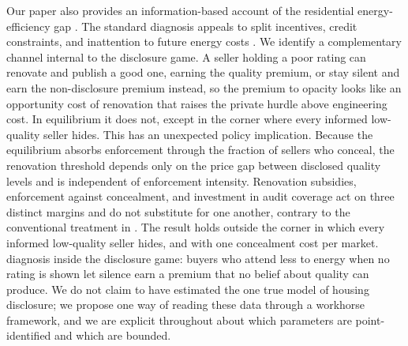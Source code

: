 Our paper also provides an information-based account of the residential energy-efficiency gap
\citep{allcott_is_2012, gerarden_assessing_2017}. The standard diagnosis appeals to split
incentives, credit constraints, and inattention to future energy costs \citep{allcott_consumers_2011, sallee_rational_2014, allcott_evaluating_2015}. We identify a
complementary channel internal to the disclosure game. A seller holding a poor rating can
renovate and publish a good one, earning the quality premium, or stay silent and earn the
non-disclosure premium instead, so the premium to opacity looks like an opportunity cost of
renovation that raises the private hurdle above engineering cost. In equilibrium it does not, except in the corner where every informed low-quality seller hides. This has an unexpected policy
implication. Because the equilibrium absorbs enforcement through the fraction of sellers who
conceal, the renovation threshold depends only on the price gap between disclosed quality
levels and is independent of enforcement intensity. Renovation subsidies, enforcement against
concealment, and investment in audit coverage act on three distinct margins and do not substitute for one another,
contrary to the conventional treatment in
\citet{gillingham_palmer_2014}. The result holds outside the corner in which every informed low-quality seller hides, and with one concealment cost per market. %
diagnosis inside the disclosure game: buyers who attend less to energy when no rating is shown let
silence earn a premium that no belief about quality can produce. We do not claim to have estimated the one true model of housing
disclosure; we propose one way of reading these data through a workhorse framework, and we are
explicit throughout about which parameters are point-identified and which are bounded.

